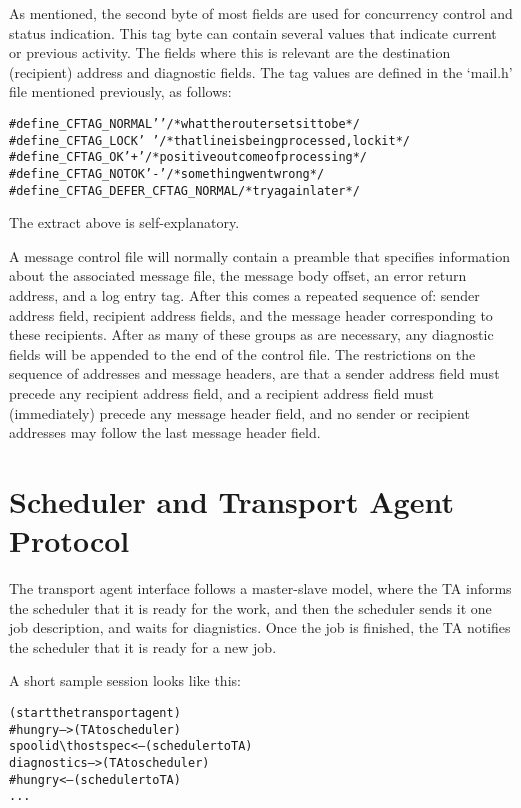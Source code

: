 As mentioned, the second byte of most fields are used for concurrency
control and status indication.  This tag byte can contain several values
that indicate current or previous activity.  The fields where this is
relevant are the destination (recipient) address and diagnostic fields.
The tag values are defined in the `mail.h' file mentioned previously, as
follows:
\begin{alltt}
     #define _CFTAG_NORMAL ' ' /* what the router sets it to be */
     #define _CFTAG_LOCK   '~' /* that line is being processed, lock it */
     #define _CFTAG_OK     '+' /* positive outcome of processing */
     #define _CFTAG_NOTOK  '-' /* something went wrong */
     #define _CFTAG_DEFER  _CFTAG_NORMAL /* try again later */
\end{alltt}

The extract above is self-explanatory.

A message control file will normally contain a preamble that specifies
information about the associated message file, the message body offset, an
error return address, and a log entry tag.  After this comes a repeated
sequence of: sender address field, recipient address fields, and the
message header corresponding to these recipients.  After as many of these
groups as are necessary, any diagnostic fields will be appended to the end
of the control file.  The restrictions on the sequence of addresses and
message headers, are that a sender address field must precede any recipient
address field, and a recipient address field must (immediately) precede any
message header field, and no sender or recipient addresses may follow the
last message header field.






\section{Scheduler and Transport Agent Protocol}



The transport agent interface follows a master-slave model,
where  the  TA  informs the scheduler that it is ready for
the work, and then the scheduler sends it one job 
description,  and  waits  for diagnistics.  Once the job is 
finished, the TA notifies the scheduler that it is ready for
a new job.

A short sample session looks like this:
\begin{alltt}
{\rm{}(start the transport agent)}
#hungry             {\rm{--> (TA to scheduler)}}
spoolid \verb/\t/ hostspec {\rm{<-- (scheduler to TA)}}
diagnostics         {\rm{--> (TA to scheduler)}}
#hungry             {\rm{<-- (scheduler to TA)}}
...
\end{alltt}

